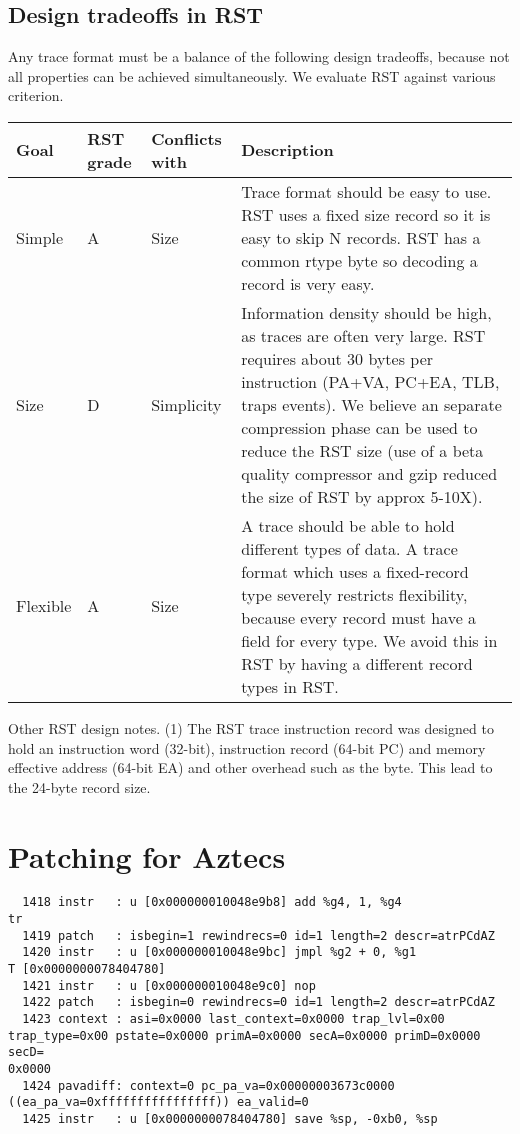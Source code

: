 \documentclass[10pt]{article}
\begin{document}
\subsection{Design tradeoffs in RST}

Any trace format must be a balance of the following design tradeoffs,
because not all properties can be achieved simultaneously.  We evaluate
RST against various criterion.

\begin{tabularx}{\linewidth}{|l|l|l|X|} \hline
  Goal & RST grade & Conflicts with & Description \\ \hline
  Simple & A & Size & Trace format should be easy to use.  RST uses a
fixed size record so it is easy to skip N records.  RST has a common
rtype byte so decoding a record is very easy.  \\ \hline
  Size & D & Simplicity & Information density should be high, as traces
are often very large.  RST requires about 30 bytes per instruction
(PA+VA, PC+EA, TLB, traps events).  We believe an separate compression
phase can be used to reduce the RST size (use of a beta quality
compressor and gzip reduced the size of RST by approx 5-10X).  \\ \hline
  Flexible & A & Size & A trace should be able to hold different types
of data.  A trace format which uses a fixed-record type severely
restricts flexibility, because every record must have a field for every
type.  We avoid this in RST by having a different record types in RST.
  \\ \hline
\end{tabularx}

Other RST design notes.  (1) The RST trace instruction record was
designed to hold an instruction word (32-bit), instruction record
(64-bit PC) and memory effective address (64-bit EA) and other overhead
such as the  byte.  This lead to the 24-byte record size.

\section{Patching for Aztecs}

\begin{verbatim}
  1418 instr   : u [0x000000010048e9b8] add %g4, 1, %g4                   tr 
  1419 patch   : isbegin=1 rewindrecs=0 id=1 length=2 descr=atrPCdAZ
  1420 instr   : u [0x000000010048e9bc] jmpl %g2 + 0, %g1               T [0x0000000078404780] 
  1421 instr   : u [0x000000010048e9c0] nop                               
  1422 patch   : isbegin=0 rewindrecs=0 id=1 length=2 descr=atrPCdAZ
  1423 context : asi=0x0000 last_context=0x0000 trap_lvl=0x00 trap_type=0x00 pstate=0x0000 primA=0x0000 secA=0x0000 primD=0x0000 secD=
0x0000
  1424 pavadiff: context=0 pc_pa_va=0x00000003673c0000 ((ea_pa_va=0xffffffffffffffff)) ea_valid=0
  1425 instr   : u [0x0000000078404780] save %sp, -0xb0, %sp              
\end{verbatim}
\end{document}
